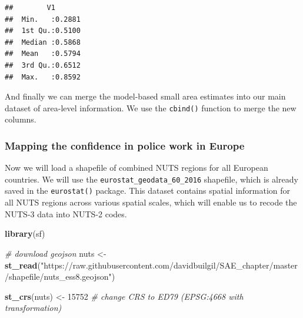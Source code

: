 \documentclass[
]{article}
\newenvironment{Shaded}{\begin{snugshade}}{\end{snugshade}}
\newcommand{\CommentTok}[1]{\textcolor[rgb]{0.56,0.35,0.01}{\textit{#1}}}
\newcommand{\DataTypeTok}[1]{\textcolor[rgb]{0.13,0.29,0.53}{#1}}
\newcommand{\DecValTok}[1]{\textcolor[rgb]{0.00,0.00,0.81}{#1}}
\newcommand{\KeywordTok}[1]{\textcolor[rgb]{0.13,0.29,0.53}{\textbf{#1}}}
\newcommand{\NormalTok}[1]{#1}
\newcommand{\OperatorTok}[1]{\textcolor[rgb]{0.81,0.36,0.00}{\textbf{#1}}}
\newcommand{\StringTok}[1]{\textcolor[rgb]{0.31,0.60,0.02}{#1}}
\begin{document}
\begin{verbatim}
##        V1        
##  Min.   :0.2881  
##  1st Qu.:0.5100  
##  Median :0.5868  
##  Mean   :0.5794  
##  3rd Qu.:0.6512  
##  Max.   :0.8592
\end{verbatim}

And finally we can merge the model-based small area estimates into our
main dataset of area-level information. We use the \texttt{cbind()}
function to merge the new columns.

\begin{Shaded}
\end{Shaded}

\hypertarget{mapping-the-confidence-in-police-work-in-europe}{%
\subsubsection{Mapping the confidence in police work in
Europe}\label{mapping-the-confidence-in-police-work-in-europe}}

Now we will load a shapefile of combined NUTS regions for all European
countries. We will use the \texttt{eurostat\_geodata\_60\_2016}
shapefile, which is already saved in the \texttt{eurostat()} package.
This dataset contains spatial information for all NUTS regions across
various spatial scales, which will enable us to recode the NUTS-3 data
into NUTS-2 codes.

\begin{Shaded}
\begin{Highlighting}[]
\KeywordTok{library}\NormalTok{(sf)}

\CommentTok{# download geojson}
\NormalTok{nuts <-}\StringTok{ }\KeywordTok{st_read}\NormalTok{(}\StringTok{"https://raw.githubusercontent.com/davidbuilgil/SAE_chapter/master/shapefile/nuts_ess8.geojson"}\NormalTok{)}

\KeywordTok{st_crs}\NormalTok{(nuts) <-}\StringTok{ }\DecValTok{15752} \CommentTok{# change CRS to ED79 (EPSG:4668 with transformation)}
\end{Highlighting}
\end{Shaded}
\end{document}
